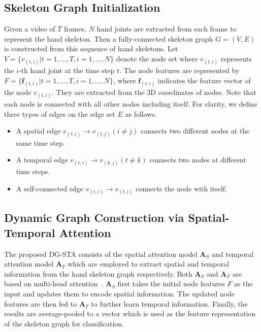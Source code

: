 \documentclass{bmvc2k}
\begin{document}
\subsection{Skeleton Graph Initialization}
\label{sec:init_g}
Given a video of $T$ frames, $N$ hand joints are extracted from each frame to represent the hand skeleton. Then a fully-connected skeleton graph $G = (V, E)$ is constructed from this sequence of hand skeletons. Let $V = \{v_{(t, i)}|t = 1, \dots , T, i = 1, \dots  , N\}$ denote the node set where $v_{(t, i)}$ represents the $i$-th hand joint at the time step $t$. The node features are represented by $F = \{\textbf{f}_{(t,i)}|t = 1, \dots , T, i = 1, \dots  , N\}$, where $\textbf{f}_{(t,i)}$ indicates the feature vector of the node $v_{(t,i)}$. They are extracted from the 3D coordinates of nodes. Note that each node is connected with all other nodes including itself. For clarity, we define three types of edges on the edge set $E$ as follows. 
\begin{itemize}
\item A spatial edge $v_{(t,i)} \rightarrow v_{(t,j)}(i \neq j)$ connects two different nodes at the same time step.
\item A temporal edge $v_{(t,i)} \rightarrow v_{(k,j)}(t \neq k)$ connects two nodes at different time steps.
\item A self-connected edge $v_{(t,i)} \rightarrow v_{(t,i)}$ connects the node with itself. 
\end{itemize}





\subsection{Dynamic Graph Construction via Spatial-Temporal Attention}
\label{sec:sta_graph}



The proposed  DG-STA consists of the spatial attention model $\mathbf{A}_S$ and temporal attention model $\mathbf{A}_T$ which are employed to extract spatial and temporal information from the hand skeleton graph respectively. Both $\mathbf{A}_S$ and $\mathbf{A}_T$ are based on multi-head attention~\cite{vaswani2017attention}. $\mathbf{A}_S$ first takes the initial node features $F$ as the input and updates them to encode spatial information. The updated node features are then fed to $\mathbf{A}_T$ to further learn temporal information. Finally, the results are average-pooled to a vector which is used as the feature representation of the skeleton graph for classification.
\end{document}
